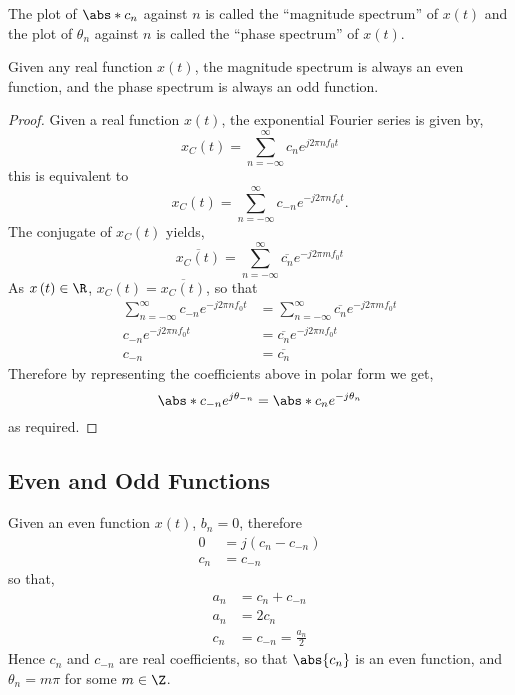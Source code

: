 \documentclass{article}
\begin{document}
The plot of \(\abs*{c_n}\) against \(n\) is called the ``magnitude spectrum'' of \(x\left( t \right)\) and
the plot of \(\theta_n\) against \(n\) is called the ``phase spectrum'' of \(x\left( t \right)\).
\begin{theorem}
    Given any real function \(x\left( t \right)\), the magnitude spectrum is always an even function,
    and the phase spectrum is always an odd function.
\end{theorem}
\begin{proof}
    Given a real function \(x\left( t \right)\), the exponential Fourier series is given by,
    \begin{equation*}
        x_C\left( t \right) = \sum_{n = -\infty}^\infty c_n e^{j 2\pi n f_0 t}
    \end{equation*}
    this is equivalent to
    \begin{equation*}
        x_C\left( t \right) = \sum_{n = -\infty}^\infty c_{-n} e^{-j 2\pi n f_0 t}.
    \end{equation*}
    The conjugate of \(x_C\left( t \right)\) yields,
    \begin{equation*}
        \overline{x_C\left( t \right)} = \sum_{n = -\infty}^\infty \overline{c_{n}} e^{-j 2\pi m f_0 t}
    \end{equation*}
    As \(x\left( t \right) \in \R\), \(x_C\left( t \right) = \overline{x_C\left( t \right)}\), so that
    \begin{align*}
        \sum_{n = -\infty}^\infty c_{-n} e^{-j 2\pi n f_0 t} & = \sum_{n = -\infty}^\infty \overline{c_{n}} e^{-j 2\pi m f_0 t} \\
        c_{-n} e^{-j 2\pi n f_0 t}                           & = \overline{c_n} e^{-j 2\pi n f_0 t}                             \\
        c_{-n}                                              & = \overline{c_n}
    \end{align*}
    Therefore by representing the coefficients above in polar form we get,
    \begin{equation*}
        \abs*{c_{-n}} e^{j \theta_{-n}} = \abs*{c_n} e^{-j \theta_n}
    \end{equation*}
    as required.
\end{proof}
\subsection{Even and Odd Functions}
Given an even function \(x\left( t \right)\), \(b_n = 0\), therefore
\begin{align*}
    0   & = j \left( c_n - c_{-n} \right) \\
    c_n & = c_{-n}
\end{align*}
so that,
\begin{align*}
    a_n & = c_n + c_{-n}           \\
    a_n & = 2 c_n                  \\
    c_n & = c_{-n} = \frac{a_n}{2}
\end{align*}
Hence \(c_n\) and \(c_{-n}\) are real coefficients, so that \(\abs{c_n}\) is an even function, and \(\theta_n = m \pi\) for some \(m \in \Z\).
\end{document}
